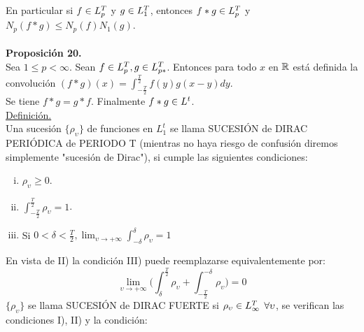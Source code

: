  En particular si $f \in L_p^T$ y $g \in L_1^T$, entonces $f*g \in L_p^T$ y $N_p (f*g) \leq N_p (f) N_1 (g)$. \\ \\
 \textbf{Proposición 20.}\\ 
 Sea $1 \leq p < \infty$. Sean $f \in L_p^T, g\in L_{p*}^T$. Entonces para todo $x$ en $\mathbb{R}$ está definida la convolución $(f*g)(x)=\int_{-\frac{T}{2}}^{\frac{T}{2}} f(y)g(x-y)dy$. \\
 Se tiene $f*g=g*f$. Finalmente $f*g \in L^t$. \\
 \underline{Definición.}\\
 Una sucesión $\lbrace \rho_\upsilon \rbrace$ de funciones en $L_1^t$ se llama SUCESIÓN de DIRAC PERIÓDICA de PERIODO T (mientras no haya riesgo de confusión diremos simplemente "sucesión de Dirac"), si cumple las siguientes condiciones:
 
 \begin{enumerate}[i)]
 \item $\rho_\upsilon \geq 0$.
 
 \item $\int_{-\frac{T}{2}}^{\frac{T}{2}} \rho_\upsilon =1$.
 
 \item Si $0 < \delta < \frac{T}{2}, \lim_{\upsilon \to +\infty} \int_{-\delta}^\delta \rho_\upsilon =1$
 \end{enumerate}
 
 En vista de II) la condición III) puede reemplazarse equivalentemente por:
 $$
 \lim_{\upsilon \to +\infty} \biggl( \int_\delta^{\frac{T}{2}} \rho_\upsilon + \int_{-\frac{T}{2}}^{-\delta}\rho_\upsilon \biggl)=0
 $$
$\lbrace \rho_\upsilon \rbrace $ se llama SUCESIÓN de DIRAC FUERTE si $\rho_\upsilon \in L_\infty^T$ $\forall \upsilon$, se verifican las condiciones I), II) y la condición:

